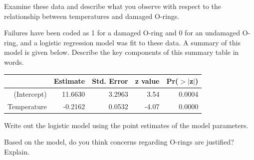 {\begin{parts}
Examine these data and describe what you observe with respect to the 
relationship between temperatures and damaged O-rings.
\item Failures have been coded as 1 for a damaged O-ring and 0 for an undamaged 
O-ring, and a logistic regression model was fit to these data. A summary of this 
model is given below. Describe the key components of this summary table in words.
\begin{center}
\begin{tabular}{rrrrr}
  \hline
            & Estimate & Std. Error & z value   & Pr($>$$|$z$|$) \\ 
  \hline
(Intercept) & 11.6630  & 3.2963     & 3.54      & 0.0004 \\ 
Temperature & -0.2162  & 0.0532     & -4.07     & 0.0000 \\ 
  \hline
\end{tabular}
\end{center}
\item Write out the logistic model using the point estimates of the model 
parameters.
\item Based on the model, do you think concerns regarding O-rings are justified? 
Explain.
\end{parts}
}{}



